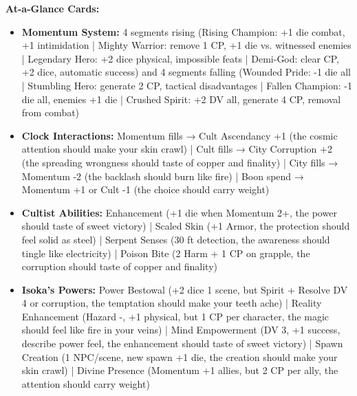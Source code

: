 \documentclass[11pt]{article}
\begin{document}
\textbf{At-a-Glance Cards:}
\begin{itemize}
\item \textbf{Momentum System:} 4 segments rising (Rising Champion: +1 die combat, +1 intimidation | Mighty Warrior: remove 1 CP, +1 die vs. witnessed enemies | Legendary Hero: +2 dice physical, impossible feats | Demi-God: clear CP, +2 dice, automatic success) and 4 segments falling (Wounded Pride: -1 die all | Stumbling Hero: generate 2 CP, tactical disadvantages | Fallen Champion: -1 die all, enemies +1 die | Crushed Spirit: +2 DV all, generate 4 CP, removal from combat)
\item \textbf{Clock Interactions:} Momentum fills → Cult Ascendancy +1 (the cosmic attention should make your skin crawl) | Cult fills → City Corruption +2 (the spreading wrongness should taste of copper and finality) | City fills → Momentum -2 (the backlash should burn like fire) | Boon spend → Momentum +1 or Cult -1 (the choice should carry weight)
\item \textbf{Cultist Abilities:} Enhancement (+1 die when Momentum 2+, the power should taste of sweet victory) | Scaled Skin (+1 Armor, the protection should feel solid as steel) | Serpent Senses (30 ft detection, the awareness should tingle like electricity) | Poison Bite (2 Harm + 1 CP on grapple, the corruption should taste of copper and finality)
\item \textbf{Isoka's Powers:} Power Bestowal (+2 dice 1 scene, but Spirit + Resolve DV 4 or corruption, the temptation should make your teeth ache) | Reality Enhancement (Hazard -, +1 physical, but 1 CP per character, the magic should feel like fire in your veins) | Mind Empowerment (DV 3, +1 success, describe power feel, the enhancement should taste of sweet victory) | Spawn Creation (1 NPC/scene, new spawn +1 die, the creation should make your skin crawl) | Divine Presence (Momentum +1 allies, but 2 CP per ally, the attention should carry weight)
\end{itemize}
\end{document}
